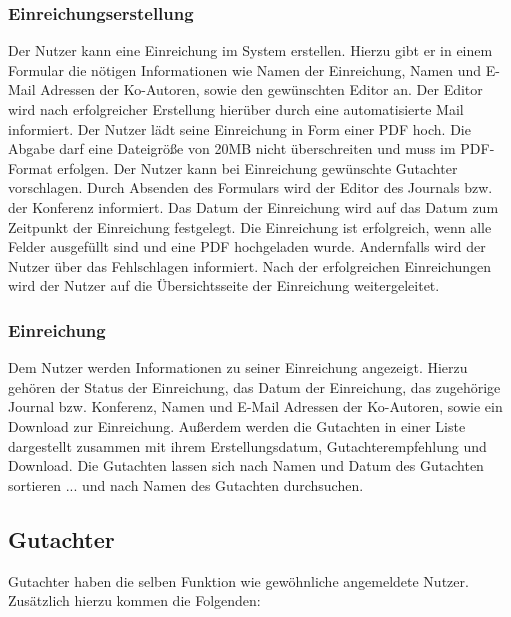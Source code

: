 \subsubsection{Einreichungserstellung}
\begin{description}
     Der Nutzer kann eine Einreichung im System erstellen. Hierzu gibt er in einem
    Formular die nötigen Informationen wie Namen der Einreichung, Namen und E-Mail Adressen der Ko-Autoren,
    sowie den gewünschten Editor an. Der Editor wird nach erfolgreicher Erstellung hierüber durch eine
    automatisierte Mail informiert.
     Der Nutzer lädt seine Einreichung in Form einer PDF hoch. Die Abgabe darf eine Dateigröße
    von 20MB nicht überschreiten und muss im PDF-Format erfolgen.
     Der Nutzer kann bei Einreichung gewünschte Gutachter vorschlagen.
     Durch Absenden des Formulars wird der Editor des Journals bzw. der Konferenz
    informiert. Das Datum der Einreichung wird auf das Datum zum Zeitpunkt der Einreichung festgelegt.
     Die Einreichung ist erfolgreich, wenn alle Felder ausgefüllt sind und eine PDF
    hochgeladen wurde. Andernfalls wird der Nutzer über das Fehlschlagen informiert.
     Nach der erfolgreichen Einreichungen wird der Nutzer auf die Übersichtsseite der
    Einreichung weitergeleitet.
\end{description}

\subsubsection{Einreichung}
\begin{description}
     Dem Nutzer werden Informationen zu seiner Einreichung angezeigt.
    Hierzu gehören der Status der Einreichung, das Datum der Einreichung, das zugehörige
    Journal bzw. Konferenz, Namen und E-Mail Adressen der Ko-Autoren, sowie ein Download zur Einreichung.
     Außerdem werden die Gutachten in einer
    Liste dargestellt zusammen mit ihrem Erstellungsdatum, Gutachterempfehlung und Download. %
    \XXitem{} Die Gutachten lassen sich nach Namen und Datum
    des Gutachten sortieren
    ... und nach Namen des Gutachten durchsuchen.
\end{description}

\subsection{Gutachter}\label{funkt:Gutachter}
Gutachter haben die selben Funktion wie gewöhnliche angemeldete Nutzer. Zusätzlich hierzu kommen die Folgenden:

